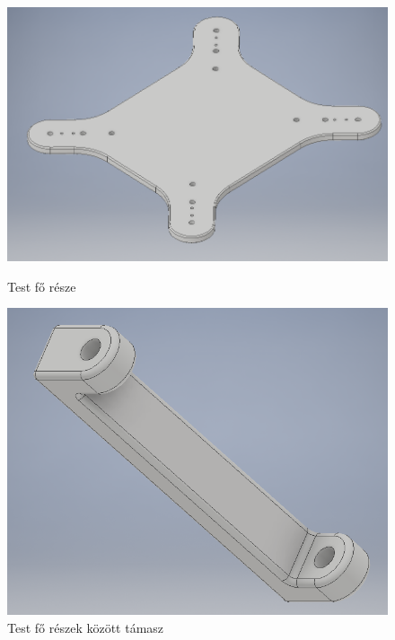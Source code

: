 \documentclass{article}
\begin{document}
\begin{figure}
\centering
\begin{minipage}{0.3\textwidth}
	\centering
	\includegraphics[width=\textwidth]{testfo}
	\caption{Test fő része}
\end{minipage}\hfill
\begin{minipage}{0.3\textwidth}
	\centering
	\includegraphics[width=\textwidth]{testtarto}
	\caption{Test fő részek között támasz}
\end{minipage}\hfill
\begin{minipage}{0.3\textwidth}
	\centering

\end{minipage}
\end{figure}
\end{document}
